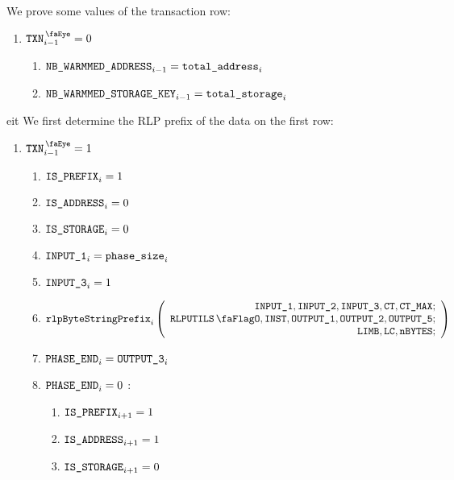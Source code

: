 We prove some values of the transaction row:
\begin{enumerate}[resume]
	\item \If $\isTxn_{i-1}=0$ \Then
		\begin{enumerate}
			\item $\texttt{NB\_WARMMED\_ADDRESS}_{i-1} = \texttt{total\_address}_{i}$
			\item $\texttt{NB\_WARMMED\_STORAGE\_KEY}_{i-1} = \texttt{total\_storage}_{i}$ 
		\end{enumerate}
\end{enumerate}
eit
We first determine the RLP prefix of the data on the first row:
\begin{enumerate}[resume]
	\item \If $\isTxn_{i-1}=1$ \Then
		\begin{enumerate}
			\item $\texttt{IS\_PREFIX} _{i} = 1$
			\item $\texttt{IS\_ADDRESS}   _{i} = 0$
			\item $\texttt{IS\_STORAGE}    _{i} = 0$
			\item $\texttt{INPUT\_1}_{i} = \texttt{phase\_size}_{i}$
			\item $\texttt{INPUT\_3}_{i} = 1$ 
			\item 
				\[
					\rlpBytestringPrefix_{i}
					\left(
					\begin{array}{r}
						\inputColumn{1},
						\inputColumn{2},
						\inputColumn{3},
						\ct,
						\maxCt; \\
						\rlpUtilsFlag,
						\INST,
						\resultColumn{1},
						\resultColumn{2},
						\resultColumn{5}; \\
						\limb,
						\lc,
						\limbsize; \\
					\end{array}
					\right)
				\]
			\item $\texttt{PHASE\_END}_{i} = \texttt{OUTPUT\_3}_{i}$
			\item \If $\texttt{PHASE\_END}_{i} =0$ \Then:
				\begin{enumerate}
					\item $\texttt{IS\_PREFIX} _{i+1} = 1$
					\item $\texttt{IS\_ADDRESS}   _{i+1} = 1$
					\item $\texttt{IS\_STORAGE}    _{i+1} = 0$
				\end{enumerate}
		\end{enumerate}
\end{enumerate}

